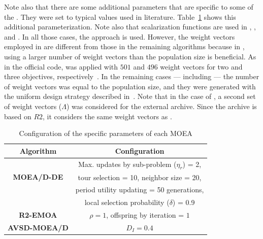 Note also that there are some additional parameters that are specific to some of the \MOEAS{}.
%
They were set to typical values used in literature. 
%
Table~\ref{tab:Parametrization} shows this additional parameterization.
%
Note also that scalarization functions are used in \MOEADDE{}, \RMOEA{}, \NSGAIII{} and \AVSDMOEAD{}.
%
In all those cases, the \ASF{} approach is used.
%
However, the weight vectors employed in \RMOEA{} are different from those in the remaining algorithms because in \RMOEA{}, using
a larger number of weight vectors than the population size is beneficial.
%
As in the official code, \RMOEA{} was applied with $501$ and $496$ weight vectors for two and three objectives, 
respectively~\cite{trautmann2013r2}.
%
In the remaining cases --- including \AVSDMOEAD{} --- the number of weight vectors was equal to the population size, and they were generated
with the uniform design strategy described in~\cite{wagner:13}.
%
Note that in the case of \AVSDMOEAD{}, a second set of weight vectors ($\Lambda$) was considered for the external archive.
%
Since the archive is based on $R2$, it considers the same weight vectors as \RMOEA{}.

\begin{table}[t]
\centering
\caption{Configuration of the specific parameters of each MOEA}
\label{tab:Parametrization}
\begin{scriptsize}
\begin{tabular}{c|c}
\hline
\textbf{Algorithm} & \textbf{Configuration} \\ \hline
\multirow{3}{*}{
\textbf{MOEA/D-DE}} & Max. updates by sub-problem ($\eta_r$) = 2, \\
 & tour selection = 10,   neighbor size = 20, \\
 & period utility updating = 50 generations, \\
 & local selection probability ($\delta$) = 0.9\\ \hline
\textbf{R2-EMOA} & $\rho=1$, offspring by iteration = $1$ \\ \hline
\textbf{AVSD-MOEA/D} & $D_I=0.4$ \\ \hline
\end{tabular}
\end{scriptsize}
\end{table}








